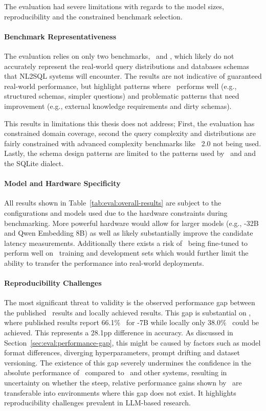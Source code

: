 The evaluation had severe limitations with regards to the model
sizes, reproducibility and the constrained benchmark selection.

\paragraph{Benchmark Representativeness}

The evaluation relies on only two benchmarks, \Spider~and \Bird, which likely
do not accurately represent the real-world query distributions and databases
schemas that NL2SQL systems will encounter. The results are not indicative of
guaranteed real-world performance, but highlight patterns where
\Natural~performs well (e.g., structured schemas, simpler questions) and
problematic patterns that need improvement (e.g., external knowledge
requirements and dirty schemas).

This results in limitations this thesis does not address; First, the evaluation
has constrained domain coverage, second the query complexity and distributions
are fairly constrained with advanced complexity benchmarks like \Spider~2.0 not
being used. Lastly, the schema design patterns are limited to the patterns used
by \Spider~and \Bird and the SQLite dialect.

\paragraph{Model and Hardware Specificity}

All results shown in Table~\ref{tab:eval:overall-results} are subject to the
configurations and models used due to the hardware constraints during
benchmarking. More powerful hardware would allow for larger models (e.g.,
\OmniSQL-32B and Qwen Embedding 8B) as well as likely substantially improve the
candidate latency measurements. Additionally there exists a risk of
\OmniSQL~being fine-tuned to perform well on \Spider~training and development
sets which would further limit the ability to transfer the performance into
real-world deployments. 

\paragraph{Reproducibility Challenges}

The most significant threat to validity is the observed performance gap between
the published \OmniSQL~results and locally achieved results. This gap is
substantial on \Bird, where published results report 66.1\% \EA~for \OmniSQL-7B
while locally only 38.0\% \EA~could be achieved. This represents a 28.1pp
difference in accuracy. As discussed in Section~\ref{sec:eval:performance-gap},
this might be caused by factors such as model format differences, diverging
hyperparameters, prompt drifting and dataset versioning. The existence of this
gap severely undermines the confidence in the absolute performance of
\Natural~compared to \OmniSQL~and other systems, resulting in uncertainty on
whether the steep, relative performance gains shown by \Natural~are
transferable into environments where this gap does not exist. It highlights
reproducibility challenges prevalent in LLM-based research.

